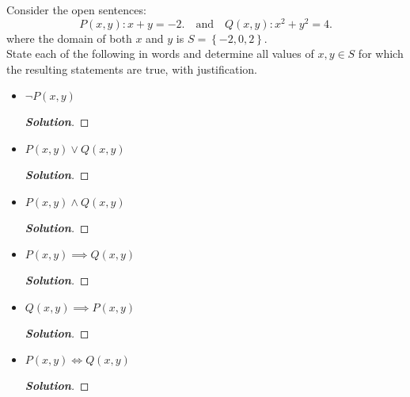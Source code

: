 \documentclass[11pt]{article}
\newenvironment{problem}[2][Problem\!]{\begin{trivlist}
\item[\hskip \labelsep {\bfseries #1}\hskip \labelsep {\bfseries #2.}]}{\end{trivlist}}
\newenvironment{solution}{\begin{proof}[\textbf{\textit{Solution}}]}{\end{proof}}
\newcommand{\set}[1]{\left\{#1\right\}} %
\begin{document}
\newpage %

\begin{problem}{2.2}
Consider the open sentences:
\[P(x,y) : x+y = -2. \quad \text{and} \quad Q(x,y) : x^2 + y^2 = 4.\]
where the domain of both $x$ and $y$ is $S = \set{-2, 0, 2}$.\\[0.5em]
State each of the following in words and determine all values of $x,y \in S$ for which the resulting statements are true, with justification.
\begin{itemize}[itemsep=3em]
\item[(a)] $\neg P(x,y)$
\begin{solution}
\end{solution}

\item[(b)] $P(x,y) \lor Q(x,y)$
\begin{solution}
\end{solution}

\item[(c)] $P(x,y) \land Q(x,y)$
\begin{solution}
\end{solution}

\item[(d)] $P(x,y) \implies Q(x,y)$
\begin{solution}
\end{solution}

\item[(e)] $Q(x,y) \implies P(x,y)$
\begin{solution}
\end{solution}

\item[(f)] $P(x,y) \iff Q(x,y)$
\begin{solution}
\end{solution}
\end{itemize}
\end{problem}
\end{document}
